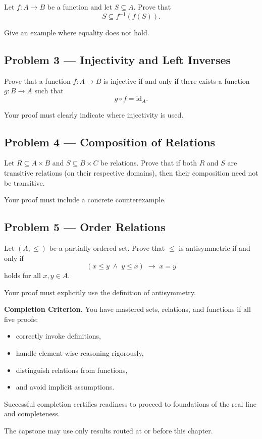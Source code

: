 Let $f : A \to B$ be a function and let $S \subseteq A$.
Prove that
\[
S \subseteq f^{-1}(f(S)).
\]

Give an example where equality does not hold.

\vspace{1.5em}

\subsection*{Problem 3 — Injectivity and Left Inverses}

Prove that a function $f : A \to B$ is injective
if and only if there exists a function $g : B \to A$
such that
\[
g \circ f = \mathrm{id}_A.
\]

Your proof must clearly indicate where injectivity is used.

\vspace{1.5em}

\subsection*{Problem 4 — Composition of Relations}

Let $R \subseteq A \times B$ and $S \subseteq B \times C$
be relations.
Prove that if both $R$ and $S$ are transitive relations
(on their respective domains), then their composition
need not be transitive.

Your proof must include a concrete counterexample.

\vspace{1.5em}

\subsection*{Problem 5 — Order Relations}

Let $(A,\le)$ be a partially ordered set.
Prove that $\le$ is antisymmetric if and only if
\[
(x \le y \;\land\; y \le x) \;\rightarrow\; x = y
\]
holds for all $x,y \in A$.

Your proof must explicitly use the definition of antisymmetry.

\vspace{1em}

\noindent
\textbf{Completion Criterion.}
You have mastered sets, relations, and functions if all five proofs:
\begin{itemize}
  \item correctly invoke definitions,
  \item handle element-wise reasoning rigorously,
  \item distinguish relations from functions,
  \item and avoid implicit assumptions.
\end{itemize}

\noindent
Successful completion certifies readiness to proceed to
foundations of the real line and completeness.

\begin{remark*}
The capstone may use only results routed at or before this chapter.
\end{remark*}

\clearpage
